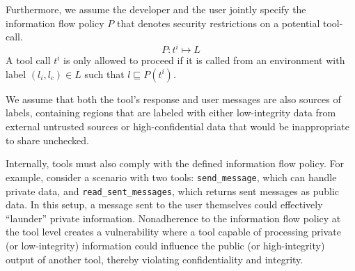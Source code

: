 Furthermore, we assume the developer and the user jointly specify the information flow policy $P$ that denotes security restrictions on a potential tool-call. 
{
\setlength{\abovedisplayskip}{2pt}
\setlength{\belowdisplayskip}{2pt}
\begin{equation}
P : t^i \mapsto L
\label{eq:security_policy}
\end{equation}
}
A tool call $t^i$ is only allowed to proceed if it is called from an environment with label $(l_i,l_c)\in L$ such that $l \sqsubseteq P(t^i)$. 


We assume that both the tool's response and user messages are also sources of labels, containing regions that are labeled with either low-integrity data from external untrusted sources or high-confidential data that would be inappropriate to share unchecked. 

Internally, tools must also comply with the defined information flow policy. For example, consider a scenario with two tools: \texttt{send\_message}, which can handle private data, and \texttt{read\_sent\_messages}, which returns sent messages as public data. In this setup, a message sent to the user themselves could effectively “launder” private information. Nonadherence to the information flow policy at the tool level creates a vulnerability where a tool capable of processing private (or low-integrity) information could influence the public (or high-integrity) output of another tool, thereby violating confidentiality and integrity.






































